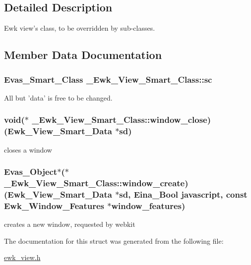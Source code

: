 \subsection{Detailed Description}
Ewk view's class, to be overridden by sub-\/classes. 

\subsection{Member Data Documentation}
\hypertarget{struct__Ewk__View__Smart__Class_a02f459baba6f2dfaea30b89a536565fc}{
\subsubsection[{sc}]{\setlength{\rightskip}{0pt plus 5cm}Evas\+\_\+\+Smart\+\_\+\+Class \+\_\+\+Ewk\+\_\+\+View\+\_\+\+Smart\+\_\+\+Class\+::sc}}\label{struct__Ewk__View__Smart__Class_a02f459baba6f2dfaea30b89a536565fc}
All but 'data' is free to be changed. \hypertarget{struct__Ewk__View__Smart__Class_a31f6ed4872b25f49c501f6b40f00c92f}{
\subsubsection[{window\+\_\+close}]{\setlength{\rightskip}{0pt plus 5cm}void($\ast$ \+\_\+\+Ewk\+\_\+\+View\+\_\+\+Smart\+\_\+\+Class\+::window\+\_\+close)({\bf Ewk\+\_\+\+View\+\_\+\+Smart\+\_\+\+Data} $\ast$sd)}}\label{struct__Ewk__View__Smart__Class_a31f6ed4872b25f49c501f6b40f00c92f}
closes a window \hypertarget{struct__Ewk__View__Smart__Class_a9d7f52e3cb15ab9ea6b4b0ff4747a0fc}{
\subsubsection[{window\+\_\+create}]{\setlength{\rightskip}{0pt plus 5cm}Evas\+\_\+\+Object$\ast$($\ast$ \+\_\+\+Ewk\+\_\+\+View\+\_\+\+Smart\+\_\+\+Class\+::window\+\_\+create)({\bf Ewk\+\_\+\+View\+\_\+\+Smart\+\_\+\+Data} $\ast$sd, Eina\+\_\+\+Bool javascript, const {\bf Ewk\+\_\+\+Window\+\_\+\+Features} $\ast$window\+\_\+features)}}\label{struct__Ewk__View__Smart__Class_a9d7f52e3cb15ab9ea6b4b0ff4747a0fc}
creates a new window, requested by webkit 

The documentation for this struct was generated from the following file\+:\begin{DoxyCompactItemize}
\item 
\hyperlink{ewk__view_8h}{ewk\+\_\+view.\+h}\end{DoxyCompactItemize}
